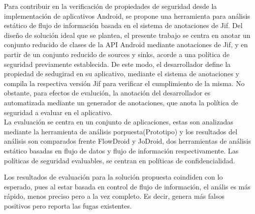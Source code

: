 Para contribuir en la verificación de propiedades de seguridad desde la
implementación de aplicativos Android, se propone una herramienta para análisis
estático de flujo de información basada en el sistema de anotaciones de Jif.
Del diseño de solución ideal que se plantea, el presente trabajo se centra en
anotar un conjunto reducido de clases de la API Android mediante anotaciones de
Jif, y en partir de un conjunto reducido de sources y sinks, acorde a una
política de seguridad previamente establecida.\newline
De este modo, el desarrollador define la propiedad de sedugirad en su
aplicativo, mediante el sistema de anotaciones y compila la respectiva versión
Jif para verificar el cumplimiento de la misma.\newline
No obstante, para efectos de evalución, la anotación del desarrollador es
automatizada mediante un generador de anotaciones, que anota la política de
seguridad a evaluar en el aplicativo.\\ 
La evaluación se centra en un conjunto de aplicaciones, estas son analizadas
mediante la herramienta de análisis porpuesta(Prototipo) y los resultados del
análisis son comparados frente FlowDroid y JoDroid, dos herramientas de
análisis estático basadas en flujo de datos y flujo de información
respectivamente.\newline
Las políticas de seguridad evaluables, se centran en políticas de
confidencialidad.\Newline

Los resultados de evaluación para la solución propuesta coindiden con lo
esperado, pues al estar basada en control de flujo de información, el anális es
más rápido, menos preciso pero a la vez completo. Es decir, genera más falsos
positivos pero reporta las fugas existentes.

























